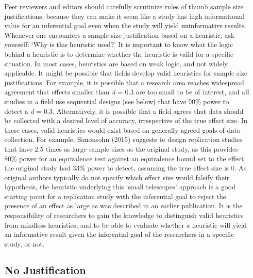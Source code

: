 \documentclass[
  english,
  ,jou,floatsintext]{apa6}
\begin{document}
Peer reviewers and editors should carefully scrutinize rules of thumb sample size justifications, because they can make it seem like a study has high informational value for an inferential goal even when the study will yield uninformative results. Whenever one encounters a sample size justification based on a heuristic, ask yourself: `Why is this heuristic used?' It is important to know what the logic behind a heuristic is to determine whether the heuristic is valid for a specific situation. In most cases, heuristics are based on weak logic, and not widely applicable. It might be possible that fields develop valid heuristics for sample size justifications. For example, it is possible that a research area reaches widespread agreement that effects smaller than \emph{d} = 0.3 are too small to be of interest, and all studies in a field use sequential designs (see below) that have 90\% power to detect a \emph{d} = 0.3. Alternatively, it is possible that a field agrees that data should be collected with a desired level of accuracy, irrespective of the true effect size. In these cases, valid heuristics would exist based on generally agreed goals of data collection. For example, Simonsohn (2015) suggests to design replication studies that have 2.5 times as large sample sizes as the original study, as this provides 80\% power for an equivalence test against an equivalence bound set to the effect the original study had 33\% power to detect, assuming the true effect size is 0. As original authors typically do not specify which effect size would falsify their hypothesis, the heuristic underlying this `small telescopes' approach is a good starting point for a replication study with the inferential goal to reject the presence of an effect as large as was described in an earlier publication. It is the responsibility of researchers to gain the knowledge to distinguish valid heuristics from mindless heuristics, and to be able to evaluate whether a heuristic will yield an informative result given the inferential goal of the researchers in a specific study, or not.

\hypertarget{no-justification}{%
\subsection{No Justification}\label{no-justification}}
\end{document}
